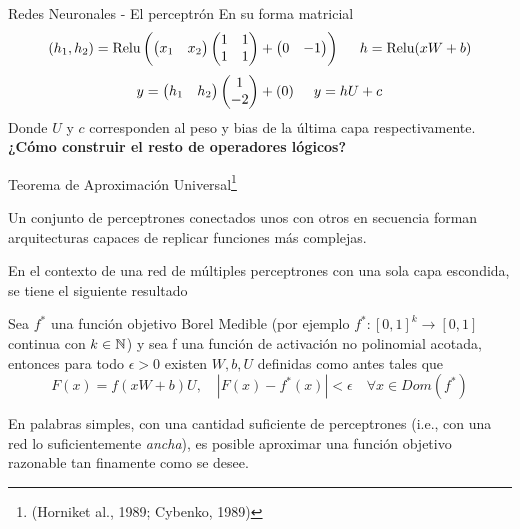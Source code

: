 \documentclass[handout, 9pt]{beamer}
\begin{document}
\begin{frame}{Redes Neuronales - El perceptrón}
En su forma matricial 
$$
(h_1 , h_2) = \text{Relu} \left ( \begin{pmatrix}
x_1 & x_2  
\end{pmatrix} \begin{pmatrix}
1 &1 \\ 
 1 & 1
\end{pmatrix} + \begin{pmatrix}
0 & -1 
\end{pmatrix}\right) \hspace{0.5cm} h = \text{Relu}(xW + b)
$$
\pause
$$
y = \begin{pmatrix}
h_1 & h_2 
\end{pmatrix}\begin{pmatrix}
1 \\ 
-2 
\end{pmatrix} + (0) \hspace{0.5cm} y = hU + c
$$
Donde $U$ y $c$ corresponden al peso y bias de la última capa respectivamente. 
\textbf{¿Cómo construir el resto de operadores lógicos?}
\end{frame}

\begin{frame}{Teorema de Aproximación Universal\footnote{(Horniket al., 1989; Cybenko, 1989)} }

Un conjunto de perceptrones conectados unos con otros en secuencia forman arquitecturas capaces de replicar funciones más complejas.  \pause

En el contexto de una red de múltiples perceptrones con una sola capa escondida, se tiene el siguiente resultado \pause

\begin{theorem}

Sea $f^{*}$ una función objetivo Borel Medible (por ejemplo $f^{*}:[0,1]^k \rightarrow [0,1]$ continua con $k \in {\mathbb N}$) y sea f una función de activación no polinomial acotada, entonces para todo $\epsilon > 0$ existen $W,b,U$ definidas como antes tales que 
\[
F(x) = f(xW+b)U, \quad 
|F(x)-f^{*}(x)|<\epsilon \quad \forall x \in Dom(f^{*}) 
\]
\end{theorem} \pause
En palabras simples, con una cantidad suficiente de perceptrones (i.e., con una red lo suficientemente \emph{ancha}), es posible aproximar una función objetivo razonable tan finamente como se desee. 
\end{frame}
\end{document}
